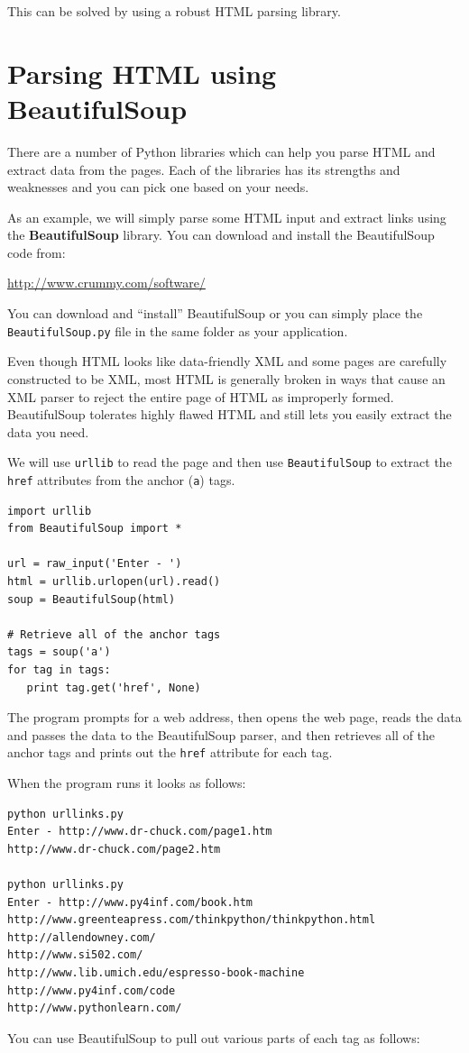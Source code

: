 This can be solved by using a robust HTML parsing library.

\section{Parsing HTML using BeautifulSoup}

There are a number of Python libraries which can help you parse
HTML and extract data from the pages.  Each of the libraries
has its strengths and weaknesses and you can pick one based on 
your needs.

As an example, we will simply parse some HTML input 
and extract links using the {\bf BeautifulSoup} library.   
You can download and install the BeautifulSoup code
from:

\url{http://www.crummy.com/software/}

You can download and ``install'' BeautifulSoup or you 
can simply place the {\tt BeautifulSoup.py} file in the
same folder as your application.

Even though HTML looks like data-friendly XML and some pages are carefully 
constructed to be XML, most HTML is generally broken in ways
that cause an XML parser to reject the entire page of HTML as
improperly formed.  BeautifulSoup tolerates highly flawed 
HTML and still lets you easily extract the data you need.

We will use {\tt urllib} to read the page and then use
{\tt BeautifulSoup} to extract the {\tt href} attributes from the
anchor ({\tt a}) tags.

\beforeverb
\begin{verbatim}
import urllib
from BeautifulSoup import *

url = raw_input('Enter - ')
html = urllib.urlopen(url).read()
soup = BeautifulSoup(html)

# Retrieve all of the anchor tags
tags = soup('a')
for tag in tags:
   print tag.get('href', None)
\end{verbatim}
\afterverb
%
The program prompts for a web address, then opens the web
page, reads the data and passes the data to the BeautifulSoup
parser, and then retrieves all of the anchor tags and prints
out the {\tt href} attribute for each tag.

When the program runs it looks as follows:

\beforeverb
\begin{verbatim}
python urllinks.py 
Enter - http://www.dr-chuck.com/page1.htm
http://www.dr-chuck.com/page2.htm

python urllinks.py 
Enter - http://www.py4inf.com/book.htm
http://www.greenteapress.com/thinkpython/thinkpython.html
http://allendowney.com/
http://www.si502.com/
http://www.lib.umich.edu/espresso-book-machine
http://www.py4inf.com/code
http://www.pythonlearn.com/
\end{verbatim}
\afterverb
%
You can use BeautifulSoup to pull out various parts of each 
tag as follows:

